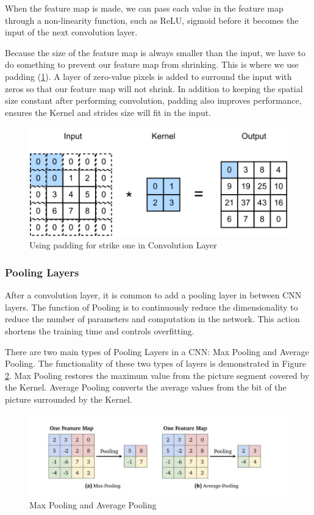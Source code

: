 When the feature map is made, we can pass each value in the feature map through a non-linearity function, such as ReLU, sigmoid before it becomes the input of the next convolution layer.

Because the size of the feature map is always smaller than the input, we have to do something to prevent our feature map from shrinking. This is where we use padding (\ref{fig:Chap3-CNN_Padding}). A layer of zero-value pixels is added to surround the input with zeros so that our feature map will not shrink. In addition to keeping the spatial size constant after performing convolution, padding also improves performance, ensures the Kernel and strides size will fit in the input.

\begin{figure}[H]
	\centering
	\includegraphics[width=\textwidth]{img/Chap3/CNN_Padding}
	\caption{Using padding for strike one in Convolution Layer}
	\label{fig:Chap3-CNN_Padding}
\end{figure}
\subsubsection{Pooling Layers}

After a convolution layer, it is common to add a pooling layer in between CNN layers. The function of Pooling is to continuously reduce the dimensionality to reduce the number of parameters and computation in the network. This action shortens the training time and controls overfitting.

There are two main types of Pooling Layers in a CNN: Max Pooling and Average Pooling. The functionality of these two types of layers is demonstrated in Figure \ref{fig:Chap3-CNN_Pooling}. Max Pooling restores the maximum value from the picture segment covered by the Kernel. Average Pooling converts the average values from the bit of the picture surrounded by the Kernel.

\begin{figure}[H]
	\centering
	\includegraphics[width=\textwidth]{img/Chap3/Pooling}
	\caption{Max Pooling and Average Pooling}
	\label{fig:Chap3-CNN_Pooling}
\end{figure}

